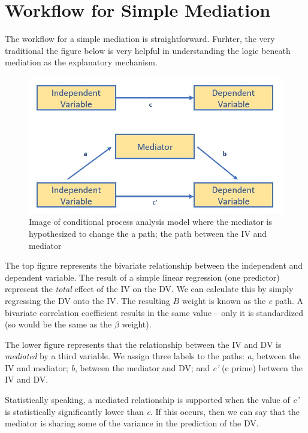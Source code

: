 \documentclass[
  11pt,
]{book}
\begin{document}
\hypertarget{workflow-for-simple-mediation}{%
\section{Workflow for Simple Mediation}\label{workflow-for-simple-mediation}}

The workflow for a simple mediation is straightforward. Furhter, the very traditional the figure below is very helpful in understanding the logic beneath mediation as the explanatory mechanism.

\begin{figure}
\centering
\includegraphics{images/SimpleMed/MedRationale.jpg}
\caption{Image of conditional process analysis model where the mediator is hypothesized to change the a path; the path between the IV and mediator}
\end{figure}

The top figure represents the bivariate relationship between the independent and dependent variable. The result of a simple linear regression (one predictor) represent the \emph{total} effect of the IV on the DV. We can calculate this by simply regressing the DV onto the IV. The resulting \(B\) weight is known as the \emph{c} path. A bivariate correlation coefficient results in the same value -- only it is standardized (so would be the same as the \(\beta\) weight).

The lower figure represents that the relationship between the IV and DV is \emph{mediated} by a third variable. We assign three labels to the paths: \emph{a}, between the IV and mediator; \emph{b}, between the mediator and DV; and \emph{c'} (c prime) between the IV and DV.

Statistically speaking, a mediated relationship is supported when the value of \emph{c'} is statistically significantly lower than \emph{c}. If this occurs, then we can say that the mediator is sharing some of the variance in the prediction of the DV.
\end{document}
